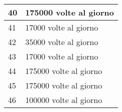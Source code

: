 \begin{table}[H]
{\begin{tabular}{ll}
\multicolumn{1}{|l|}{40} & \multicolumn{1}{l|}{175000 volte al giorno}  \\ \hline
\multicolumn{1}{|l|}{41} & \multicolumn{1}{l|}{17000 volte al giorno}   \\ \hline
\multicolumn{1}{|l|}{42} & \multicolumn{1}{l|}{35000 volte al giorno}   \\ \hline
\multicolumn{1}{|l|}{43} & \multicolumn{1}{l|}{17000 volte al giorno}   \\ \hline
\multicolumn{1}{|l|}{44} & \multicolumn{1}{l|}{175000 volte al giorno}  \\ \hline
\multicolumn{1}{|l|}{45} & \multicolumn{1}{l|}{175000 volte al giorno}  \\ \hline
\multicolumn{1}{|l|}{46} & \multicolumn{1}{l|}{100000 volte al giorno}  \\ \hline
\end{tabular}
}
\end{table}

